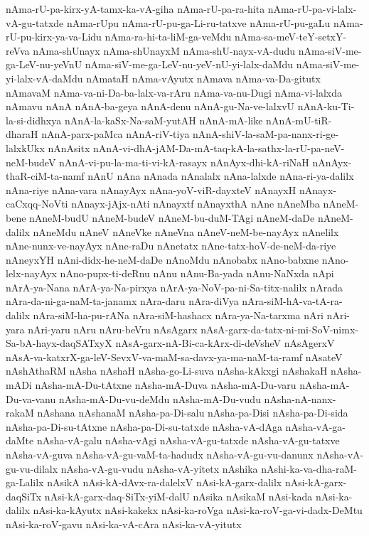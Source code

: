 {nAma-rU-pa-kirx-yA-tamx-ka-vA-giha
nAma-rU-pa-ra-hita
nAma-rU-pa-vi-lalx-vA-gu-tatxde
nAma-rUpu
nAma-rU-pu-ga-Li-ru-tatxve
nAma-rU-pu-gaLu
nAma-rU-pu-kirx-ya-va-Lidu
nAma-ra-hi-ta-liM-ga-veMdu
nAma-sa-meV-teY-setxY-reVva
nAma-shUnayx
nAma-shUnayxM
nAma-shU-nayx-vA-dudu
nAma-siV-me-ga-LeV-nu-yeVnU
nAma-siV-me-ga-LeV-nu-yeV-nU-yi-lalx-daMdu
nAma-siV-me-yi-lalx-vA-daMdu
nAmataH
nAma-vAyutx
nAmava
nAma-va-Da-gitutx
nAmavaM
nAma-va-ni-Da-ba-lalx-va-rAru
nAma-va-nu-Dugi
nAma-vi-lalxda
nAmavu
nAnA
nAnA-ba-geya
nAnA-denu
nAnA-gu-Na-ve-lalxvU
nAnA-ku-Ti-la-si-didhxya
nAnA-la-kaSx-Na-saM-yutAH
nAnA-mA-like
nAnA-mU-tiR-dharaH
nAnA-parx-paMca
nAnA-riV-tiya
nAnA-shiV-la-saM-pa-nanx-ri-ge-lalxkUkx
nAnAsitx
nAnA-vi-dhA-jAM-Da-mA-taq-kA-la-sathx-la-rU-pa-neV-neM-budeV
nAnA-vi-pu-la-ma-ti-vi-kA-rasayx
nAnAyx-dhi-kA-riNaH
nAnAyx-thaR-ciM-ta-namf
nAnU
nAna
nAnada
nAnalalx
nAna-lalxde
nAna-ri-ya-dalilx
nAna-riye
nAna-vara
nAnayAyx
nAna-yoV-viR-dayxteV
nAnayxH
nAnayx-caCxqq-NoVti
nAnayx-jAjx-nAti
nAnayxtf
nAnayxthA
nAne
nAneMba
nAneM-bene
nAneM-budU
nAneM-budeV
nAneM-bu-duM-TAgi
nAneM-daDe
nAneM-dalilx
nAneMdu
nAneV
nAneVke
nAneVna
nAneV-neM-be-nayAyx
nAnelilx
nAne-nunx-ve-nayAyx
nAne-raDu
nAnetatx
nAne-tatx-hoV-de-neM-da-riye
nAneyxYH
nAni-didx-he-neM-daDe
nAnoMdu
nAnobabx
nAno-babxne
nAno-lelx-nayAyx
nAno-pupx-ti-deRnu
nAnu
nAnu-Ba-yada
nAnu-NaNxda
nApi
nArA-ya-Nana
nArA-ya-Na-pirxya
nArA-ya-NoV-pa-ni-Sa-titx-nalilx
nArada
nAra-da-ni-ga-naM-ta-janamx
nAra-daru
nAra-diVya
nAra-siM-hA-va-tA-ra-dalilx
nAra-siM-ha-pu-rANa
nAra-siM-hashacx
nAra-ya-Na-tarxma
nAri
nAri-yara
nAri-yaru
nAru
nAru-beVru
nAsAgarx
nAsA-garx-da-tatx-ni-mi-SoV-nimx-Sa-bA-hayx-daqSATxyX
nAsA-garx-nA-Bi-ca-kArx-di-deVsheV
nAsAgerxV
nAsA-va-katxrX-ga-leV-SevxV-va-maM-sa-davx-ya-ma-naM-ta-ramf
nAsateV
nAshAthaRM
nAsha
nAshaH
nAsha-go-Li-suva
nAsha-kAkxgi
nAshakaH
nAsha-mADi
nAsha-mA-Du-tAtxne
nAsha-mA-Duva
nAsha-mA-Du-varu
nAsha-mA-Du-va-vanu
nAsha-mA-Du-vu-deMdu
nAsha-mA-Du-vudu
nAsha-nA-nanx-rakaM
nAshana
nAshanaM
nAsha-pa-Di-salu
nAsha-pa-Disi
nAsha-pa-Di-sida
nAsha-pa-Di-su-tAtxne
nAsha-pa-Di-su-tatxde
nAsha-vA-dAga
nAsha-vA-ga-daMte
nAsha-vA-galu
nAsha-vAgi
nAsha-vA-gu-tatxde
nAsha-vA-gu-tatxve
nAsha-vA-guva
nAsha-vA-gu-vaM-ta-hadudx
nAsha-vA-gu-vu-danunx
nAsha-vA-gu-vu-dilalx
nAsha-vA-gu-vudu
nAsha-vA-yitetx
nAshika
nAshi-ka-va-dha-raM-ga-Lalilx
nAsikA
nAsi-kA-dAvx-ra-dalelxV
nAsi-kA-garx-dalilx
nAsi-kA-garx-daqSiTx
nAsi-kA-garx-daq-SiTx-yiM-dalU
nAsika
nAsikaM
nAsi-kada
nAsi-ka-dalilx
nAsi-ka-kAyutx
nAsi-kakekx
nAsi-ka-roVga
nAsi-ka-roV-ga-vi-dadx-DeMtu
nAsi-ka-roV-gavu
nAsi-ka-vA-cAra
nAsi-ka-vA-yitutx
}

